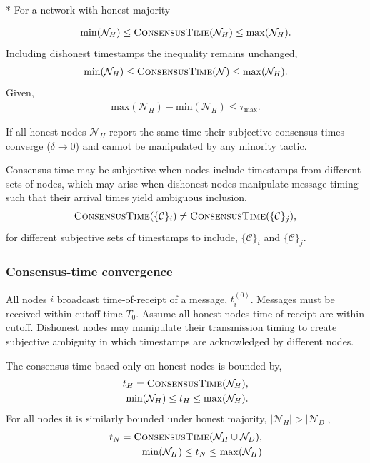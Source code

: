 * For a network with honest majority

\begin{align}
	\mathrm{min}(\mathcal{N}_H)\leq\textsc{ConsensusTime}(\mathcal{N}_H) \leq \mathrm{max}(\mathcal{N}_H).
\end{align}
Including dishonest timestamps the inequality remains unchanged,
\begin{align}
	\mathrm{min}(\mathcal{N}_H)\leq\textsc{ConsensusTime}(\mathcal{N}) \leq \mathrm{max}(\mathcal{N}_H).
\end{align}
Given,
\begin{align}
	\mathrm{max}(\mathcal{N}_H) - \mathrm{min}(\mathcal{N}_H) \leq  \tau_\mathrm{max}.
\end{align}

If all honest nodes $\mathcal{N}_H$ report the same time their subjective consensus times converge (\mbox{$\delta\to 0$}) and cannot be manipulated by any minority tactic.

Consensus time may be subjective when nodes include timestamps from different sets of nodes, which may arise when dishonest nodes manipulate message timing such that their arrival times yield ambiguous inclusion.
\begin{align}
	\textsc{ConsensusTime}(\{\mathcal{C}\}_i) \neq \textsc{ConsensusTime}(\{\mathcal{C}\}_j),
\end{align}
for different subjective sets of timestamps to include, $\{\mathcal{C}\}_i$ and $\{\mathcal{C}\}_j$.

\subsubsection{Consensus-time convergence}

All nodes $i$ broadcast time-of-receipt of a message, $t_i^{(0)}$. Messages must be received within cutoff time $T_0$. Assume all honest nodes time-of-receipt are within cutoff. Dishonest nodes may manipulate their transmission timing to create subjective ambiguity in which timestamps are acknowledged by different nodes.

The consensus-time based only on honest nodes is bounded by,
\begin{align}
	t_H = \textsc{ConsensusTime}(\mathcal{N}_H),\nonumber\\
	\mathrm{min}(\mathcal{N}_H) \leq t_H\leq \mathrm{max}(\mathcal{N}_H).
\end{align}
For all nodes it is similarly bounded under honest majority, \mbox{$|\mathcal{N}_H|>|\mathcal{N}_D|$},
\begin{align}
	t_N = \textsc{ConsensusTime}(\mathcal{N}_H\cup \mathcal{N}_D),\nonumber\\
	\mathrm{min}(\mathcal{N}_H) \leq t_N\leq \mathrm{max}(\mathcal{N}_H)
\end{align}

